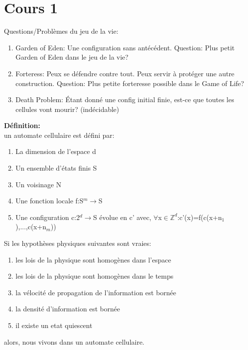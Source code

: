 \section{Cours 1}
Questions/Problèmes du jeu de la vie:
\begin{enumerate}
	\item Garden of Eden: Une configuration sans antécédent. Question: Plus petit Garden of Eden dans le jeu de la
	vie?
	\item Forteress: Peux se défendre contre tout. Peux servir à protéger une autre construction. Question: Plus petite
	forteresse possible dans le Game of Life?
	\item Death Problem: Étant donné une config initial finie, est-ce que toutes les cellules vont mourir? (indécidable)
\end{enumerate}

\textbf{Définition:\\}
un automate cellulaire est défini par:
\begin{enumerate}
	\item La dimension de l'espace d
	\item Un ensemble d'états finis S
	\item Un voisinage N
	\item Une fonction locale f:S$^m\rightarrow$S
	\item Une configuration c:2$^d\rightarrow$S évolue en c' avec,
	$\forall$x$\in\mathbb{Z}^d$:c'(x)=f(c(x+n$_1$),...,c(x+n$_m$))
\end{enumerate}

Si les hypothèses physiques suivantes sont vraies:
\begin{enumerate}
	\item les lois de la physique sont homogènes dans l'espace
	\item les lois de la physique sont homogènes dans le temps 
	\item la vélocité de propagation de l'information est bornée
	\item la densité d'information est bornée
	\item il existe un etat quiescent
\end{enumerate}
alors, nous vivons dans un automate cellulaire.
